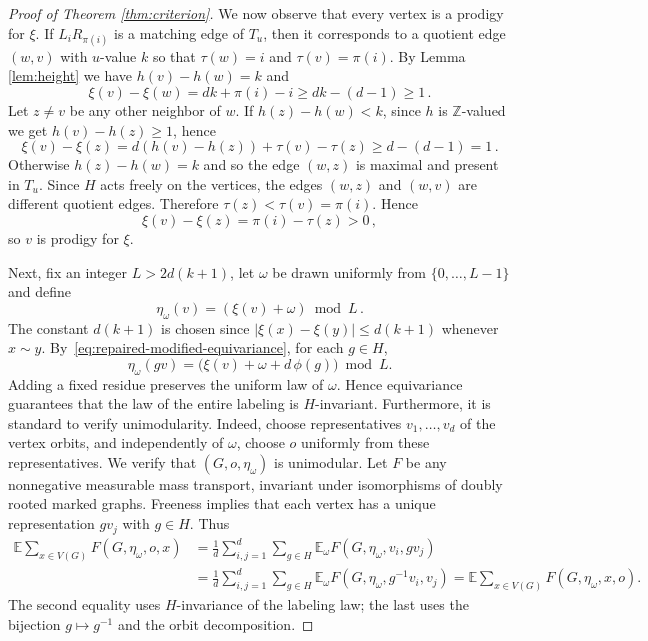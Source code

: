 \documentclass[10pt,a4paper]{amsart}
\newcommand{\Z}{\mathbb Z}
\begin{document}
\begin{proof}[Proof of Theorem \ref{thm:criterion}]
We now observe that every vertex is a prodigy for $\xi$. If $L_i R_{\pi(i)}$ is a matching edge of $T_u$, then it corresponds to a quotient edge $(w,v)$ with $u$-value $k$ so that $\tau(w)=i$ and $\tau(v)=\pi(i)$. By Lemma \ref{lem:height} we have $h(v)-h(w)=k$ and
$$ \xi(v) - \xi(w) = dk + \pi(i) - i \geq dk - (d-1) \geq 1 \, .$$
Let $z \neq v$ be any other neighbor of $w$. If $h(z) - h(w) < k$, since $h$ is $\Z$-valued we get $h(v)-h(z) \geq 1$, hence
$$ \xi(v) - \xi(z) = d(h(v)-h(z)) + \tau(v) - \tau(z) \geq d - (d-1) = 1\, .$$
Otherwise $h(z)-h(w)=k$ and so the edge $(w,z)$ is maximal and present in $T_u$. Since $H$ acts freely on the vertices, the edges $(w,z)$ and $(w,v)$ are different quotient edges. Therefore $\tau(z) < \tau(v)=\pi(i)$. Hence
$$ \xi(v) - \xi(z) = \pi(i) - \tau(z) > 0 \, ,$$
so $v$ is prodigy for $\xi$. 

Next, fix an integer $L>2d(k+1)$, let $\omega$ be drawn uniformly from
$\{0,\ldots,L-1\}$ and define
$$ \eta_\omega(v)=(\xi(v)+\omega)\bmod L \, . $$
The constant $d(k+1)$ is chosen since $|\xi(x)-\xi(y)|\leq d(k+1)$ whenever $x \sim y$. By~\eqref{eq:repaired-modified-equivariance}, for each $g\in H$,
\[
  \eta_\omega(gv)
  =\bigl(\xi(v)+\omega+d\,\phi(g)\bigr)\bmod L.
\]
Adding a fixed residue preserves the uniform law of $\omega$. Hence equivariance guarantees that the law of the entire labeling is $H$-invariant. Furthermore, it is standard to verify unimodularity. Indeed, choose  representatives $v_1,\ldots,v_d$ of the vertex
 orbits, and independently of $\omega$, choose $o$ uniformly from
 these representatives. We verify that $(G,o,\eta_\omega)$ is
 unimodular. Let $F$
 be any nonnegative measurable mass transport, invariant under
 isomorphisms of doubly rooted marked graphs. Freeness implies that
 each vertex has a unique representation $gv_j$ with $g\in H$. Thus
 \begin{align*}
   \mathbb E\sum_{x\in V(G)}F(G, \eta_\omega, o,x)
  &=\frac1d\sum_{i,j=1}^d\sum_{g\in H}
    \mathbb E_\omega F(G, \eta_\omega,v_i,gv_j)\\
  &=\frac1d\sum_{i,j=1}^d\sum_{g\in H}
    \mathbb E_\omega F(G,\eta_\omega,g^{-1}v_i,v_j) =\mathbb E\sum_{x\in V(G)}F(G, \eta_\omega,x,o).
\end{align*}
The second equality uses $H$-invariance of the labeling law; the
last uses the bijection $g\mapsto g^{-1}$ and the orbit
decomposition. 




\end{proof}
\end{document}
